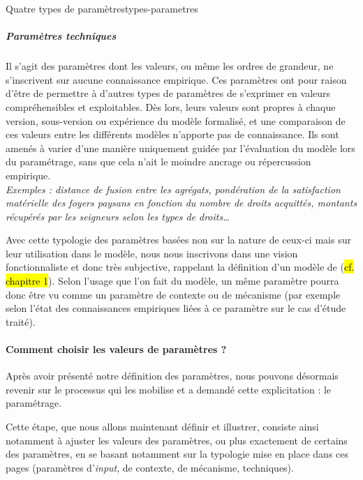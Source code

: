 \begin{encadre}{Quatre types de paramètres}{types-parametres}
\subparagraph*{Paramètres techniques}
	Il s'agit des paramètres dont les valeurs, ou même les ordres de grandeur, ne s'inscrivent sur aucune connaissance empirique.
	Ces paramètres ont pour raison d'être de permettre à d'autres types de paramètres de s'exprimer en valeurs compréhensibles et exploitables.
	Dès lors, leurs valeurs sont propres à chaque version, sous-version ou expérience du modèle formalisé, et une comparaison de ces valeurs entre les différents modèles n'apporte pas de connaissance.
	Ils sont amenés à varier d'une manière uniquement guidée par l'évaluation du modèle lors du paramétrage, sans que cela n'ait le moindre ancrage ou répercussion empirique.\\
	\textit{Exemples : distance de fusion entre les agrégats, pondération de la satisfaction matérielle des foyers paysans en fonction du nombre de droits acquittés, montants récupérés par les seigneurs selon les types de droits\ldots}
\end{encadre}

Avec cette typologie des paramètres basées non sur la nature de ceux-ci mais sur leur utilisation dans le modèle, nous nous inscrivons dans une vision fonctionnaliste et donc très subjective, rappelant la définition d'un modèle de \citeauthor{minsky_matter_1965} (\hl{cf. chapitre 1}).
Selon l'usage que l'on fait du modèle, un même paramètre pourra donc être vu comme un paramètre de contexte ou de mécanisme (par exemple selon l'état des connaissances empiriques liées à ce paramètre sur le cas d'étude traité).

\paragraph*{Comment choisir les valeurs de paramètres ?}
%

Après avoir présenté notre définition des paramètres, nous pouvons désormais revenir sur le processus qui les mobilise et a demandé cette explicitation : le paramétrage.

Cette étape, que nous allons maintenant définir et illustrer, consiste ainsi notamment à \og ajuster\fg{} les valeurs des paramètres, ou plus exactement de certains des paramètres, en se basant notamment sur la typologie mise en place dans ces pages (paramètres d'\textit{input}, de contexte, de mécanisme, techniques).
%
